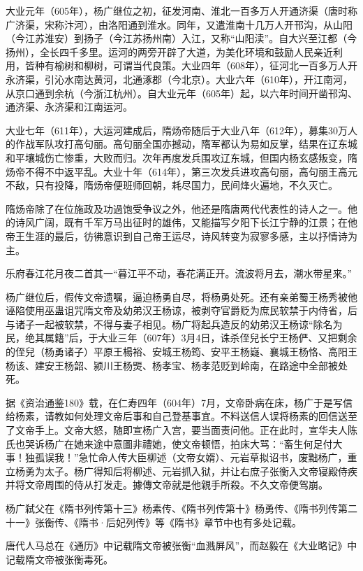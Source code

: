 大业元年（605年），杨广继位之初，征发河南、淮北一百多万人开通济渠（唐时称广济渠，宋称汴河），由洛阳通到淮水。同年，又遣淮南十几万人开邗沟，从山阳（今江苏淮安）到扬子（今江苏扬州南）入江，又称“山阳渎”。自大兴至江都（今扬州），全长四千多里。运河的两旁开辟了大道，为美化环境和鼓励人民亲近利用，皆种有榆树和柳树，可谓当代良策。大业四年（608年），征河北一百多万人开永济渠，引沁水南达黄河，北通涿郡（今北京）。大业六年（610年），开江南河，从京口通到余杭（今浙江杭州）。自大业元年（605年）起，以六年时间开凿邗沟、通济渠、永济渠和江南运河。

大业七年（611年），大运河建成后，隋炀帝随后于大业八年（612年），募集30万人的作战军队攻打高句丽。高句丽全国亦撼动，隋军都认为易如反掌，结果在辽东城和平壤城伤亡惨重，大败而归。次年再度发兵围攻辽东城，但国内杨玄感叛变，隋炀帝不得不中返平乱。大业十年（614年），第三次发兵进攻高句丽，高句丽王高元不敌，只有投降，隋炀帝便班师回朝，耗尽国力，民间烽火遍地，不久灭亡。

隋炀帝除了在位施政及功過饱受争议之外，他还是隋唐两代代表性的诗人之一。他的诗风广阔，既有千军万马出征时的雄伟，又能描写夕阳下长江宁静的江景；在他帝王生涯的最后，彷彿意识到自己帝王运尽，诗风转变为寂寥多感，主以抒情诗为主。

乐府春江花月夜二首其一“暮江平不动，春花满正开。流波将月去，潮水带星来。”

杨广继位后，假传文帝遗嘱，逼迫杨勇自尽，将杨勇处死。还有亲弟蜀王杨秀被他诬陷使用巫蛊诅咒隋文帝及幼弟汉王杨谅，被剥夺官爵贬为庶民软禁于内侍省，后与诸子一起被软禁，不得与妻子相见。杨广将起兵造反的幼弟汉王杨谅“除名为民，绝其属籍”后，于大业三年（607年）3月4日，诛杀侄兒长宁王杨俨、又把剩余的侄兒（杨勇诸子）平原王楊裕、安城王杨筠、安平王杨嶷、襄城王杨恪、高阳王杨该、建安王杨韶、颍川王杨煚、杨孝宝、杨孝范贬到岭南，在路途中全部被处死。

据《资治通鉴180》载，在仁寿四年（604年）7月，文帝卧病在床，杨广于是写信给杨素，请教如何处理文帝后事和自己登基事宜。不料送信人误将杨素的回信送至了文帝手上。文帝大怒，随即宣杨广入宫，要当面责问他。正在此时，宣华夫人陈氏也哭诉杨广在她来途中意圖非禮她，使文帝顿悟，拍床大骂：“畜生何足付大事！独孤误我！”急忙命人传大臣柳述（文帝女婿）、元岩草拟诏书，废黜杨广，重立杨勇为太子。杨广得知后将柳述、元岩抓入狱，并让右庶子张衡入文帝寝殿侍疾并将文帝周围的侍从打发走。據傳文帝就是他親手所殺。不久文帝便驾崩。

杨广弑父在《隋书列传第十三》杨素传、《隋书列传第十》杨勇传、《隋书列传第二十一》张衡传、《隋书·后妃列传》等《隋书》章节中也有多处记载。

唐代人马总在《通历》中记载隋文帝被张衡“血溅屏风”，而赵毅在《大业略记》中记载隋文帝被张衡毒死。

